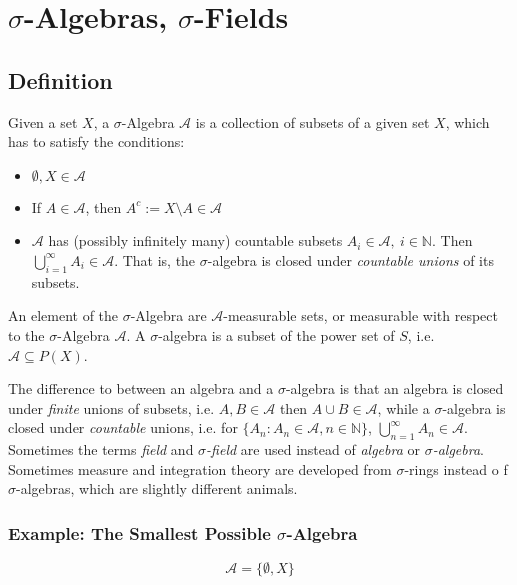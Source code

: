 \section{$\sigma$-Algebras, $\sigma$-Fields}

\subsection{Definition}
Given a set $X$, a $\sigma$-Algebra $\mathscr{A}$ is a collection of subsets of a given set $X$, which has to satisfy the conditions:


\begin{itemize}
\item $\emptyset, X \in \mathscr{A}$
\item If $A\in\mathscr{A}$, then $A^c := X\setminus A \in \mathscr{A}$
\item $\mathscr{A}$ has (possibly infinitely many) countable subsets $A_i \in \mathscr{A},\ i \in \mathbb{N}$. Then $\bigcup_{i=1}^{\infty}A_i \in \mathscr{A}$. That is, the $\sigma$-algebra is closed under \textit{countable unions} of its subsets. 
\end{itemize}

An element of the $\sigma$-Algebra are $\mathscr{A}$-measurable sets, or measurable with respect to the $\sigma$-Algebra $\mathscr{A}$. A $\sigma$-algebra is a subset of the power set of $S$, i.e. $\mathscr{A} \subseteq P(X)$. 

The difference to between an algebra and a $\sigma$-algebra is that an algebra is closed under \textit{finite} unions of subsets, i.e. $A,B\in \mathscr{A}$ then $A\cup B \in \mathscr{A}$, while a $\sigma$-algebra is closed under \textit{countable} unions, i.e. for $\{A_n: A_n \in \mathscr{A}, n\in \mathbb{N}\}$, $\bigcup_{n=1}^{\infty} A_n \in \mathscr{A}$. Sometimes the terms \textit{field} and \textit{$\sigma$-field} are used instead of \textit{algebra} or \textit{$\sigma$-algebra}. Sometimes measure and integration theory are developed from $\sigma$-rings instead o f $\sigma$-algebras, which are slightly different animals.

\subsubsection{Example: The Smallest Possible $\sigma$-Algebra}

\begin{equation}
\mathscr{A} = \{\emptyset, X\}
\end{equation}

